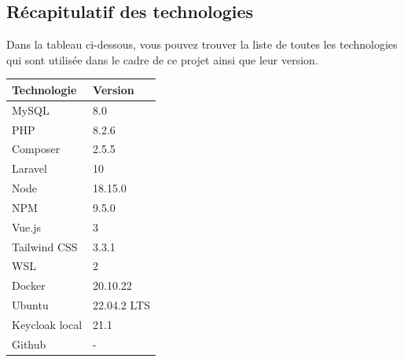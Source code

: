 \subsection{Récapitulatif des technologies}
Dans la tableau ci-dessous, vous pouvez trouver la liste de toutes les technologies qui sont utilisée dans le cadre de ce projet ainsi que leur version.
\begin{center}
    \begin{tabular}{|l|l|}
        \hline
        \textbf{Technologie} & \textbf{Version} \\
        \hline
        MySQL                & 8.0              \\
        \hline
        PHP                  & 8.2.6            \\
        \hline
        Composer             & 2.5.5            \\
        \hline
        Laravel              & 10               \\
        \hline
        Node                 & 18.15.0          \\
        \hline
        NPM                  & 9.5.0            \\
        \hline
        Vue.js               & 3                \\
        \hline
        Tailwind CSS         & 3.3.1            \\
        \hline
        WSL                  & 2                \\
        \hline
        Docker               & 20.10.22         \\
        \hline
        Ubuntu               & 22.04.2 LTS      \\
        \hline
        Keycloak local       & 21.1             \\
        \hline
        Github               & -                \\
        \hline
    \end{tabular}
\end{center}

